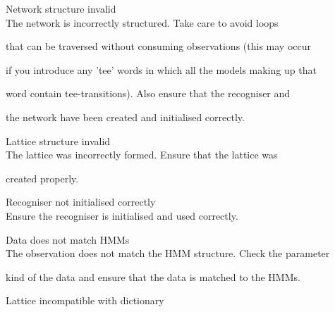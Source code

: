 \begin{itemize}
\begin{itemize}
    Network structure invalid\\


        The network is incorrectly structured.  Take care to avoid loops


        that can be traversed without consuming observations (this may occur 


        if you introduce any 'tee' words in which all the models making up that


        word contain tee-transitions).  Also ensure that the recogniser and


        the network have been created and initialised correctly.





    Lattice structure invalid\\


        The lattice was incorrectly formed.  Ensure that the lattice was


        created properly.





 Recogniser not initialised correctly\\


        Ensure the recogniser is initialised and used correctly.





    Data does not match HMMs\\


        The observation does not match the HMM structure.  Check the parameter


        kind of the data and ensure that the data is matched to the HMMs.





\end{itemize}













\begin{itemize}





    Lattice incompatible with dictionary\\



\end{itemize}
\end{itemize}
